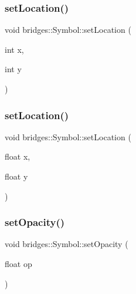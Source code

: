 \subsubsection{\texorpdfstring{set\+Location()}{setLocation()}\hspace{0.1cm}{\footnotesize\ttfamily [1/2]}}
{\footnotesize\ttfamily void bridges\+::\+Symbol\+::set\+Location (\begin{DoxyParamCaption}\item[{int}]{x,  }\item[{int}]{y }\end{DoxyParamCaption})\hspace{0.3cm}{\ttfamily [inline]}}

\mbox{\label{classbridges_1_1_symbol_a5f774c3cbd407bc74d43e8d27bb6933f}} 
\subsubsection{\texorpdfstring{set\+Location()}{setLocation()}\hspace{0.1cm}{\footnotesize\ttfamily [2/2]}}
{\footnotesize\ttfamily void bridges\+::\+Symbol\+::set\+Location (\begin{DoxyParamCaption}\item[{float}]{x,  }\item[{float}]{y }\end{DoxyParamCaption})\hspace{0.3cm}{\ttfamily [inline]}}

\mbox{\label{classbridges_1_1_symbol_a586939c47e544093cbd8f443bed8dfee}} 
\subsubsection{\texorpdfstring{set\+Opacity()}{setOpacity()}}
{\footnotesize\ttfamily void bridges\+::\+Symbol\+::set\+Opacity (\begin{DoxyParamCaption}\item[{float}]{op }\end{DoxyParamCaption})\hspace{0.3cm}{\ttfamily [inline]}}

